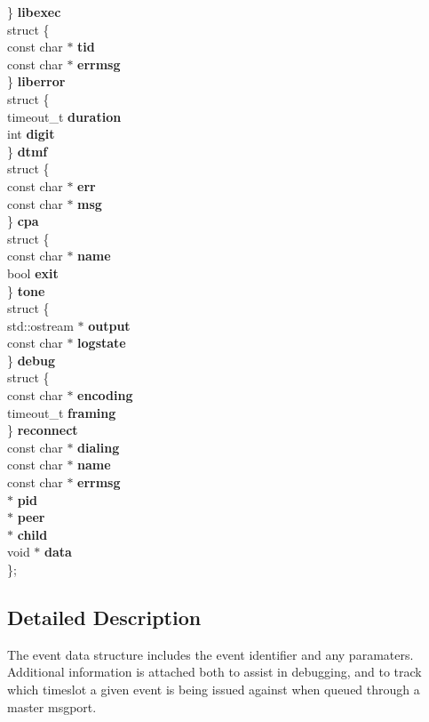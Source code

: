 \begin{DoxyCompactItemize}
\begin{tabbing}
\>\} {\bf libexec}\\
\>struct \{\\
\>\>const char $\ast$ {\bf tid}\\
\>\>const char $\ast$ {\bf errmsg}\\
\>\} {\bf liberror}\\
\>struct \{\\
\>\>timeout\_t {\bf duration}\\
\>\>int {\bf digit}\\
\>\} {\bf dtmf}\\
\>struct \{\\
\>\>const char $\ast$ {\bf err}\\
\>\>const char $\ast$ {\bf msg}\\
\>\} {\bf cpa}\\
\>struct \{\\
\>\>const char $\ast$ {\bf name}\\
\>\>bool {\bf exit}\\
\>\} {\bf tone}\\
\>struct \{\\
\>\>std::ostream $\ast$ {\bf output}\\
\>\>const char $\ast$ {\bf logstate}\\
\>\} {\bf debug}\\
\>struct \{\\
\>\>const char $\ast$ {\bf encoding}\\
\>\>timeout\_t {\bf framing}\\
\>\} {\bf reconnect}\\
\>const char $\ast$ {\bf dialing}\\
\>const char $\ast$ {\bf name}\\
\>const char $\ast$ {\bf errmsg}\\
 $\ast$ {\bf pid}\\
 $\ast$ {\bf peer}\\
 $\ast$ {\bf child}\\
\>void $\ast$ {\bf data}\\
\}; \\

\end{tabbing}\end{DoxyCompactItemize}


\subsection{Detailed Description}
The event data structure includes the event identifier and any paramaters. Additional information is attached both to assist in debugging, and to track which timeslot a given event is being issued against when queued through a master msgport. 

